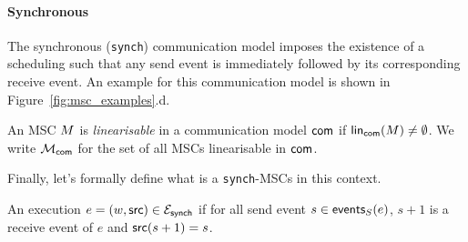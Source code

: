 

\paragraph{Synchronous}
The synchronous (\verb|synch|) communication model imposes 
the existence of a scheduling such that any send event is 
immediately followed by its corresponding receive event. 
An example for this communication model is shown in Figure~\ref{fig:msc_examples}.d.

	
\begin{definition}\label{def:linearisable-msc}
	An MSC $M$ is \textit{linearisable} in a communication model $\mathsf{com}$
	if $\mathsf{lin}_{\mathsf{com}}(M)\neq\emptyset$.
	We write $\mathcal{M}_{\mathsf{com}}$ for the set of all MSCs 
	linearisable in $\mathsf{com}$.
\end{definition}

Finally, let's formally define what is a \verb|synch|-MSCs in this context.

\begin{definition}\label{def:synch}
	An execution $e=(w,\mathsf{src}) \in \mathcal{E}_{\mathsf{synch}}$
	if for all send event $s\in\mathsf{events}_S(e)$, $s+1$ is a receive event
	of $e$ and $\mathsf{src}(s+1)=s$.
\end{definition}

